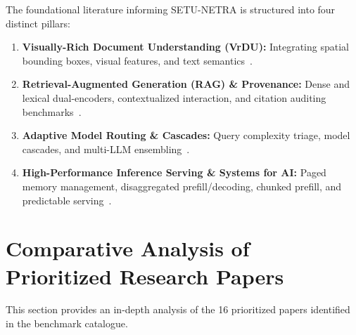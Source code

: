 \documentclass[11pt,a4paper]{article}
\begin{document}
The foundational literature informing SETU-NETRA is structured into four distinct pillars:
\begin{enumerate}[label=\textbf{Pillar \Roman*:},leftmargin=*]
    \item \textbf{Visually-Rich Document Understanding (VrDU):} Integrating spatial bounding boxes, visual features, and text semantics~\cite{Xu2020LayoutLM,Xu2021LayoutLMv2,Huang2022LayoutLMv3,Kim2022Donut,Appalaraju2021DocFormer}.
    \item \textbf{Retrieval-Augmented Generation (RAG) \& Provenance:} Dense and lexical dual-encoders, contextualized interaction, and citation auditing benchmarks~\cite{Lewis2020RAG,Karpukhin2020DPR,Khattab2020ColBERT,Gao2023ALCE,Es2024Ragas,Guu2020REALM,Asai2024SelfRAG,Menick2022GopherCite}.
    \item \textbf{Adaptive Model Routing \& Cascades:} Query complexity triage, model cascades, and multi-LLM ensembling~\cite{Chen2023FrugalGPT,Ong2024RouteLLM,Ding2024HybridLLM,Hu2024RouterBench,Jiang2023LLMBlender}.
    \item \textbf{High-Performance Inference Serving \& Systems for AI:} Paged memory management, disaggregated prefill/decoding, chunked prefill, and predictable serving~\cite{Kwon2023vLLM,Yu2022Orca,Agrawal2024Sarathi,Zhong2024DistServe,Gujarati2020Clockwork,Crankshaw2017Clipper}.
\end{enumerate}

\section{Comparative Analysis of Prioritized Research Papers}
\label{sec:prioritized}

This section provides an in-depth analysis of the 16 prioritized papers identified in the benchmark catalogue.

\end{document}
